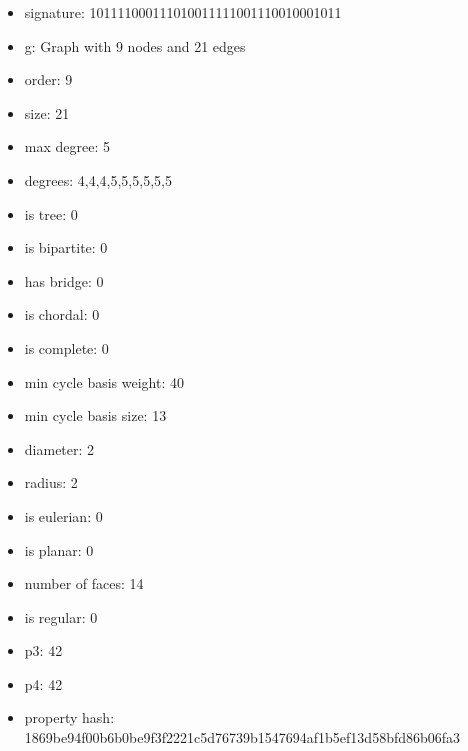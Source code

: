 \newpage
\begin{figure}
\end{figure}
\begin{itemize}
\item signature: 101111000111010011111001110010001011
\item g: Graph with 9 nodes and 21 edges
\item order: 9
\item size: 21
\item max degree: 5
\item degrees: 4,4,4,5,5,5,5,5,5
\item is tree: 0
\item is bipartite: 0
\item has bridge: 0
\item is chordal: 0
\item is complete: 0
\item min cycle basis weight: 40
\item min cycle basis size: 13
\item diameter: 2
\item radius: 2
\item is eulerian: 0
\item is planar: 0
\item number of faces: 14
\item is regular: 0
\item p3: 42
\item p4: 42
\item property hash: 1869be94f00b6b0be9f3f2221c5d76739b1547694af1b5ef13d58bfd86b06fa3
\end{itemize}
